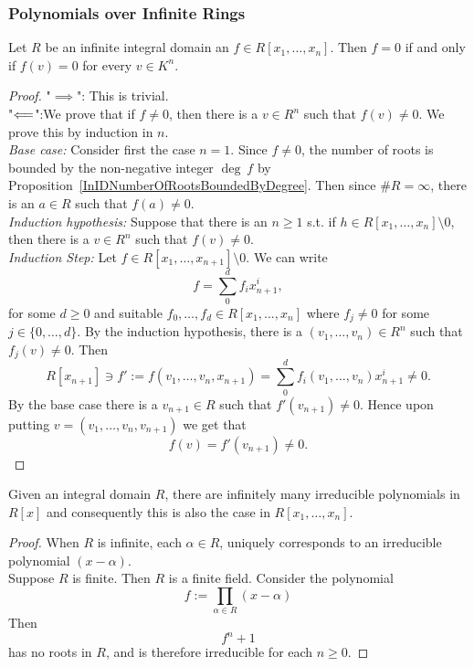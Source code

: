 \subsubsection{Polynomials over Infinite Rings}
\begin{proposition}\label{OnInfiniteIDPolynomialVanishesEverywhereIfAndOnlyIfIsZero}
    Let $R$ be an infinite integral domain an $f\in R[x_1,\dots,x_n]$. Then $f = 0$ if and only if $f(v)=0$ for every $v\in K^n$. 
\end{proposition}
\begin{proof}
    "$\implies$": This is trivial.\\
    "$\Longleftarrow$":We prove that if $f \neq 0$, then there is a $v\in R^n$ such that $f(v)\neq 0$. We prove this by induction in $n$.\\
    \textit{Base case:} Consider first the case $n = 1$. Since $f \neq 0$, the number of roots is bounded by the non-negative integer $\deg\ f$ by Proposition~\ref{InIDNumberOfRootsBoundedByDegree}. Then since $\#R=\infty$, there is an $a\in R$ such that $f(a)\neq 0$.\\ 
    \textit{Induction hypothesis:} Suppose that there is an $n \geq 1$ s.t. if $h\in R[x_1,\dots,x_n]\setminus 0 $, then there is a $v \in R^n$ such that $f(v)\neq 0$.\\
    \textit{Induction Step:} Let $f\in R[x_1,\dots,x_{n+1}]\setminus 0$. We can write 
    $$f = \sum_0^d f_ix_{n+1}^i,$$
    for some $d\geq 0$ and suitable $f_0,\dots,f_d\in R[x_1,\dots,x_n]$ where $f_j\neq 0$ for some $j\in \{0,\dots,d\}$. By the induction hypothesis, there is a $(v_1,\dots,v_n)\in R^n$ such that $f_j(v)\neq 0$. Then 
    $$R[x_{n+1}]\ni f':= f(v_1,\dots,v_n,x_{n+1}) = \sum_0^d f_i(v_1,\dots,v_n)x_{n+1}^i \neq 0.$$ 
    By the base case there is a $v_{n+1}\in R$ such that $f'(v_{n+1})\neq 0$. Hence upon putting $v= (v_1,\dots,v_n,v_{n+1})$ we get that 
    $$f(v) = f'(v_{n+1}) \neq 0.$$
\end{proof}
\begin{lemma}\label{InfinitelyManyIrreduciblePolynomialsOverIntegralDomain}
    Given an integral domain $R$, there are infinitely many irreducible polynomials in $R[x]$ and consequently this is also the case in $R[x_1,\dots,x_n]$. 
\end{lemma}
\begin{proof}
    When $R$ is infinite, each $\alpha\in R$, uniquely corresponds to an irreducible polynomial $(x-\alpha)$.\\
    Suppose $R$ is finite. Then $R$ is a finite field. Consider the polynomial 
    $$
        f := \prod_{\alpha\in R} (x-\alpha)
    $$
    Then 
    $$
        f^n +1
    $$
    has no roots in $R$, and is therefore irreducible for each $n\geq 0$. 
\end{proof}

